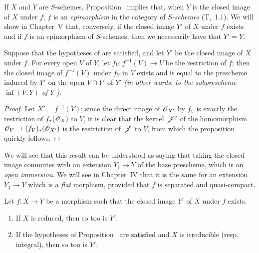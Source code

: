 \begin{remark}[9.5.7]
\label{1.9.5.7}
If $X$ and $Y$ are $S$-schemes, Proposition~ implies that, when
$Y$ is the closed image of $X$ under $f$, $f$ is an \emph{epimorphism} in the category of \emph{$S$-schemes} (T,~1.1).
We will show in Chapter~V that, conversely, if the closed image $Y'$ of $X$ under $f$ exists and if $f$ is an epimorphism of $S$-schemes, then we necessarily have that $Y'=Y$.
\end{remark}

\begin{proposition}[9.5.8]
\label{1.9.5.8}
Suppose that the hypotheses of  are satisfied, and let $Y'$ be the closed image of $X$ under $f$.
For every open $V$ of $Y$, let $f_V:f^{-1}(V)\to V$ be the restriction of $f$; then the closed image of $f^{-1}(V)$ under $f_V$ in $V$ exists and is equal to the prescheme induced by $Y'$ on the open $V\cap Y'$ of $Y'$ \emph{(in other words, to the subprescheme $\inf(V,Y)$ of $Y$ )}.
\end{proposition}

\begin{proof}
\label{proof-1.9.5.8}
Let $X'=f^{-1}(V)$; since the direct image of $\mathscr{O}_{X'}$ by $f_V$ is exactly the restriction of $f_*(\mathscr{O}_X)$ to $V$, it is clear that the kernel $\mathscr{J}'$ of the homomorphism $\sh{O}_V\to(f_V)_*(\sh{O}_{X'})$ is the restriction of $\mathscr{J}$ to $V$, from which the proposition quickly follows.
\end{proof}

We will see that this result can be understood as saying that taking the closed image commutes with an extension $Y_1\to Y$ of the base prescheme, which is an \emph{open immersion}.
We will see in Chapter~IV that it is the same for an extension $Y_1\to Y$ which is a \emph{flat} morphism, provided that $f$ is separated and quasi-compact.

\begin{proposition}[9.5.9]
\label{1.9.5.9}
Let $f:X\to Y$ be a morphism such that the closed image $Y'$ of $X$ under $f$ exists.
\begin{enumerate}[label=\emph{(\roman*)}]
  \item If $X$ is reduced, then so too is $Y'$.
  \item If the hypotheses of Proposition~ are satisfied and $X$ is irreducible (resp. integral), then so too is $Y'$.
\end{enumerate}
\end{proposition}

